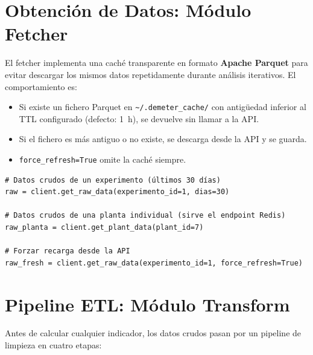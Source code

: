 \section{Obtención de Datos: Módulo Fetcher}

El fetcher implementa una caché transparente en formato \textbf{Apache Parquet} para
evitar descargar los mismos datos repetidamente durante análisis iterativos. El comportamiento es:

\begin{itemize}[leftmargin=*, label=--]
    \item Si existe un fichero Parquet en \texttt{\~{}/.demeter\_cache/} con antigüedad
          inferior al TTL configurado (defecto: 1~h), se devuelve sin llamar a la API.
    \item Si el fichero es más antiguo o no existe, se descarga desde la API y se guarda.
    \item \texttt{force\_refresh=True} omite la caché siempre.
\end{itemize}

\begin{lstlisting}[style=trama, caption={Descarga de datos con caché automática}]
# Datos crudos de un experimento (últimos 30 días)
raw = client.get_raw_data(experimento_id=1, dias=30)

# Datos crudos de una planta individual (sirve el endpoint Redis)
raw_planta = client.get_plant_data(plant_id=7)

# Forzar recarga desde la API
raw_fresh = client.get_raw_data(experimento_id=1, force_refresh=True)
\end{lstlisting}

\section{Pipeline ETL: Módulo Transform}

Antes de calcular cualquier indicador, los datos crudos pasan por un pipeline de limpieza
en cuatro etapas:

